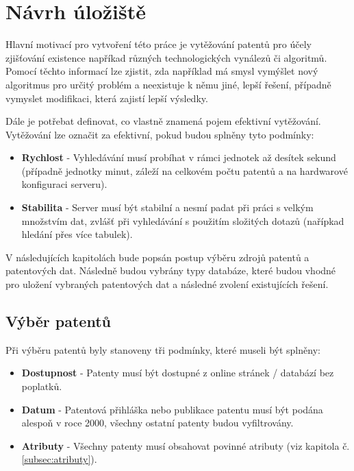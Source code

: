 \chapter{Návrh úložiště}
Hlavní motivací pro vytvoření této práce je vytěžování patentů pro účely zjišťování existence napříkad různých technologických vynálezů či algoritmů. Pomocí těchto informací lze zjistit, zda například má smysl vymýšlet nový algoritmus pro určitý problém a neexistuje k němu jiné, lepší řešení, případně vymyslet modifikaci, která zajistí lepší výsledky.
\newline

\noindent Dále je potřebat definovat, co vlastně znamená pojem efektivní vytěžování. Vytěžování lze označit za efektivní, pokud budou splněny tyto podmínky:
\begin{itemize}
\item \textbf{Rychlost} - Vyhledávání musí probíhat v rámci jednotek až desítek sekund (případně jednotky minut, záleží na celkovém počtu patentů a na hardwarové konfiguraci serveru).
\item \textbf{Stabilita} - Server musí být stabilní a nesmí padat při práci s velkým množstvím dat, zvlášť při vyhledávání s použitím složitých dotazů (nařípkad hledání přes více tabulek).
\end{itemize}

\noindent V následujících kapitolách bude popsán postup výběru zdrojů patentů a patentových dat. Následně budou vybrány typy databáze, které budou vhodné pro uložení vybraných patentových dat a následné zvolení existujících řešení.

\section{Výběr patentů}
Při výběru patentů byly stanoveny tři podmínky, které museli být splněny:
\begin{itemize}
\item \textbf{Dostupnost} - Patenty musí být dostupné z online stránek / databází bez poplatků.
\item \textbf{Datum} - Patentová přihláška nebo publikace patentu musí být podána alespoň v roce 2000, všechny ostatní patenty budou vyfiltrovány.
\item \textbf{Atributy} - Všechny patenty musí obsahovat povinné atributy (viz kapitola č. \ref{subsec:atributy}).
\end{itemize}

